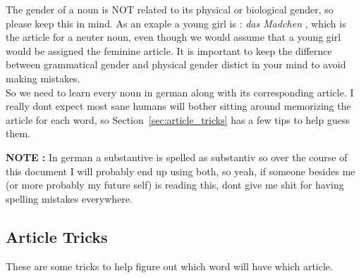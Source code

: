\documentclass[a4paper,12pt]{article}
\begin{document}
The gender of a noun is NOT related to its physical or biological gender, so
please keep this in mind. As an exaple a young girl is : \textit{das Madchen} ,
which is the article for a neuter noun, even though we would assume that a young
girl would be assigned the feminine article. It is important to keep the
differnce between grammatical gender and physical gender distict in your mind to
avoid making mistakes.\\

So we need to learn every noun in german along with its corresponding article. I
really dont expect most sane humans will bother sitting around memorizing the
article for each word, so Section~\ref{sec:article_tricks} has a few tips to
help guess them.

\begin{note-background}

\color{flame} \textbf {NOTE :} \color{black} In german a
substantive is spelled as substantiv so over the course of this document I will
probably end up using both, so yeah, if someone besides me (or more probably my
future self) is reading this, dont give me shit for having spelling mistakes
everywhere.\\

\end{note-background}

\subsection{\bf{Article Tricks}}
\begin{adjustwidth}{2em}{0pt}
\label{sec:article_tricks}
These are some tricks to help figure out which word will have which article.
\end{adjustwidth}

\end{document}
